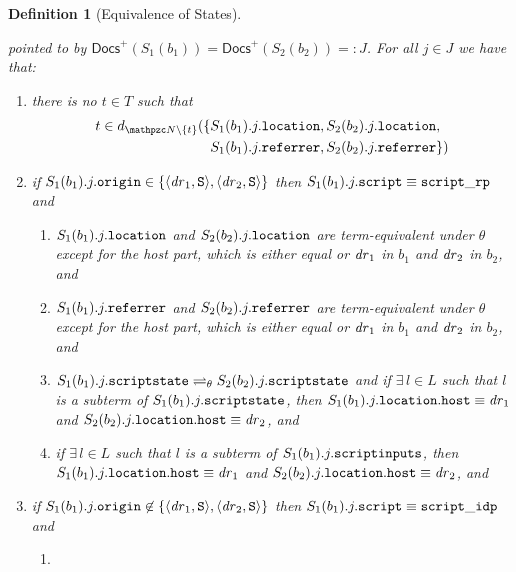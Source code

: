 \documentclass[letterpaper,onecolumn,10pt]{article}
\newtheorem{definition}{Definition}
\begin{document}
\begin{definition}[Equivalence of States]
\begin{enumerate}
\begin{enumerate}
      pointed to by $\mathsf{Docs}^+(S_1(b_1)) = \mathsf{Docs}^+(S_2(b_2)) =: J$. 
      For all $j \in J$ we have that: \label{eqs:b:w}
      \begin{enumerate}
      \item there is no $t \in T$ such that
        \begin{align*}
          t \in d_{\nonces \setminus \{t\}}(\{&S_1(b_1).j.\str{location}
          ,  S_2(b_2).j.\str{location},\\ & S_1(b_1).j.\str{referrer} , 
          S_2(b_2).j.\str{referrer}\})
        \end{align*}
      \item\label{eqs:b:w:script_rp} if
        $S_1(b_1).j.\mathtt{origin} \in \{\langle\mathit{dr}_1, \mathtt{S}\rangle,\langle\mathit{dr}_2, \mathtt{S}\rangle\}$
        then $S_1(b_1).j.\mathtt{script} \equiv \mathtt{script\_rp}$ and \
        \begin{enumerate}
        \item $S_1(b_1).j.\mathtt{location}$ and $S_2(b_2).j.\mathtt{location}$
          are term-equivalent under $\theta$ except for the host part,
          which is either equal or $\mathit{dr}_1$ in $b_1$ and $\mathit{dr}_2$ in
          $b_2$, and
        \item $S_1(b_1).j.\mathtt{referrer}$ and $S_2(b_2).j.\mathtt{referrer}$
          are term-equivalent under $\theta$ except for the host part,
          which is either equal or $\mathit{dr}_1$ in $b_1$ and $\mathit{dr}_2$ in
          $b_2$, and
        \item
          $S_1(b_1).j.\mathtt{scriptstate} \rightleftharpoons_{\theta}
          S_2(b_2).j.\mathtt{scriptstate}$ and if $\exists\, l \in L$ such that $l$ is a subterm of $S_1(b_1).j.\mathtt{scriptstate}$, then $S_1(b_1).j.\mathtt{location}.\mathtt{host} \equiv \mathit{dr}_1$ and $S_2(b_2).j.\mathtt{location}.\mathtt{host} \equiv \mathit{dr}_2$, and
        \item if $\exists\, l \in L$ such that $l$ is a subterm of
          $S_1(b_1).j.\mathtt{scriptinputs}$, then
          $S_1(b_1).j.\mathtt{location}.\mathtt{host} \equiv \mathit{dr}_1$ and
          $S_2(b_2).j.\mathtt{location}.\mathtt{host} \equiv \mathit{dr}_2$, and
        \end{enumerate}
      \item\label{eqs:b:w:att_script} if
        $S_1(b_1).j.\mathtt{origin} \not\in
        \{\langle\mathit{dr}_1,\mathtt{S}\rangle,\langle\mathit{dr}_2,\mathtt{S}\rangle\}$
        then $S_1(b_1).j.\mathtt{script} \equiv \mathtt{script\_idp}$ and \
        \begin{enumerate}
        \item

\end{enumerate}
\end{enumerate}
\end{enumerate}
\end{enumerate}
\end{definition}
\end{document}
